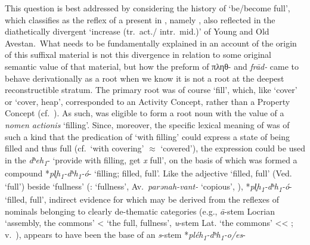 \documentclass[output=paper,colorlinks,citecolor=brown]{langscibook}
\begin{document}
This question is best addressed by considering the history of  ‘be/become full’, which  classifies as the reflex of a present in , namely , also reflected in the diathetically divergent  ‘increase (tr.\ act./ intr.\ mid.)’ of Young and Old Avestan.\ What needs to be fundamentally explained in an account of the origin of this suffixal material is not this divergence in relation to some original semantic value of that material, but how the preform of πληθ-   and \textit{frād-}  came to behave derivationally as a root when we know it is not a root at the deepest reconstructible stratum. The primary root was of course  ‘fill’, which, like  ‘cover’ or  ‘cover, heap’, corresponded to an Activity Concept, rather than a Property Concept (cf.\ \citealt[208--209]{Nussbaum2022}). As such,  was eligible to form a root noun  with the value of a \textit{nomen actionis} ‘filling’. Since, moreover, the specific lexical meaning of  was of such a kind that the predication of  ‘with filling’ could express a state of being filled and thus full (cf.\ ‘with covering’ ${\approx}$ ‘covered’), the  expression could be used in the    \textit{dʰeh\textsubscript{1}}- ‘provide with filling, get \textit{x} full’, on the basis of which was formed a compound  *\textit{pl̥h\textsubscript{1}-dʰh\textsubscript{1}-ó}- ‘filling; filled, full’. Like the  adjective  ‘filled, full’ (Ved.\  ‘full’) beside  ‘fullness’ (:  ‘fullness’, Av.\ \textit{parənah-vant-}  ‘copious’, \citealt[132, 174]{Rau2009}), *\textit{pl̥h\textsubscript{1}-dʰh\textsubscript{1}-ó}-  ‘filled, full’, indirect evidence for which may be derived from the reflexes of nominals belonging to clearly de-thematic categories (e.g., \textit{ā}-stem Locrian  ‘assembly, the commons’ <  ‘the full, fullness’, \textit{u}-stem Lat.  ‘the commons’ {<}{<} ; v.\  \citealt{Nussbaum2014b}), appears to have been the base of an \textit{s}-stem *\textit{pléh\textsubscript{1}-dʰh\textsubscript{1}-o/es}- 
\end{document}
